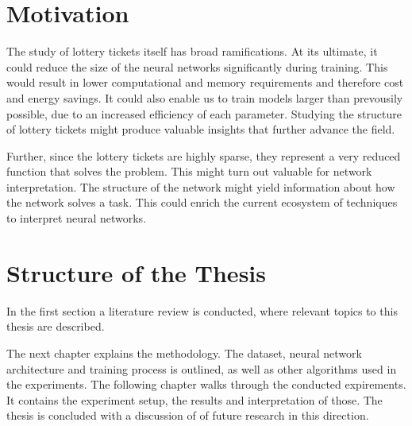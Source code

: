 \section{Motivation}
The study of lottery tickets itself has broad ramifications.
At its ultimate, it could reduce the size of the neural networks significantly during training.
This would result in lower computational and memory requirements and therefore cost and energy savings.
It could also enable us to train models larger than prevousily possible, due to an increased efficiency of each parameter.
Studying the structure of lottery tickets might produce valuable insights that further advance the field.

Further, since the lottery tickets are highly sparse, they represent a very reduced function that solves the problem.
This might turn out valuable for network interpretation.
The structure of the network might yield information about how the network solves a task.
This could enrich the current ecosystem of techniques to interpret neural networks.

\section{Structure of the Thesis}
In the first section a literature review is conducted, where relevant topics to this thesis are described.

The next chapter explains the methodology.
The dataset, neural network architecture and training process is outlined, as well as other algorithms used in the experiments.
The following chapter walks through the conducted expirements.
It contains the experiment setup, the results and interpretation of those.
The thesis is concluded with a discussion of of future research in this direction.